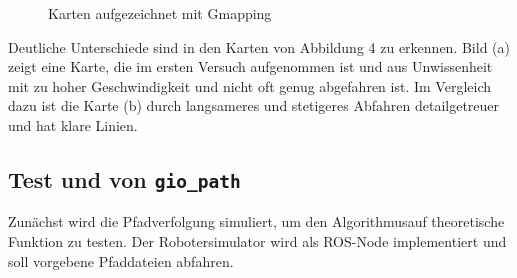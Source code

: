 \documentclass[11pt,a4paper]{article}
\begin{document}
{{	\begin{figure}[h]
		\centering
		\caption{Karten aufgezeichnet mit Gmapping}
	\end{figure}
	
	
	Deutliche Unterschiede sind in den Karten von Abbildung 4 zu erkennen. Bild (a) zeigt eine Karte, die im ersten Versuch aufgenommen ist und aus Unwissenheit mit zu hoher Geschwindigkeit und nicht oft genug abgefahren ist. Im Vergleich dazu ist die Karte (b) durch langsameres und stetigeres Abfahren detailgetreuer und hat klare Linien.
	
		
}




\subsection{Test und von \texttt{gio\_path}}


Zun\"achst wird die Pfadverfolgung simuliert, um den Algorithmusauf theoretische Funktion zu testen. Der Robotersimulator wird als ROS-Node implementiert und soll vorgebene Pfaddateien abfahren.


\begin{figure}[h]
\end{figure}}
\end{document}
